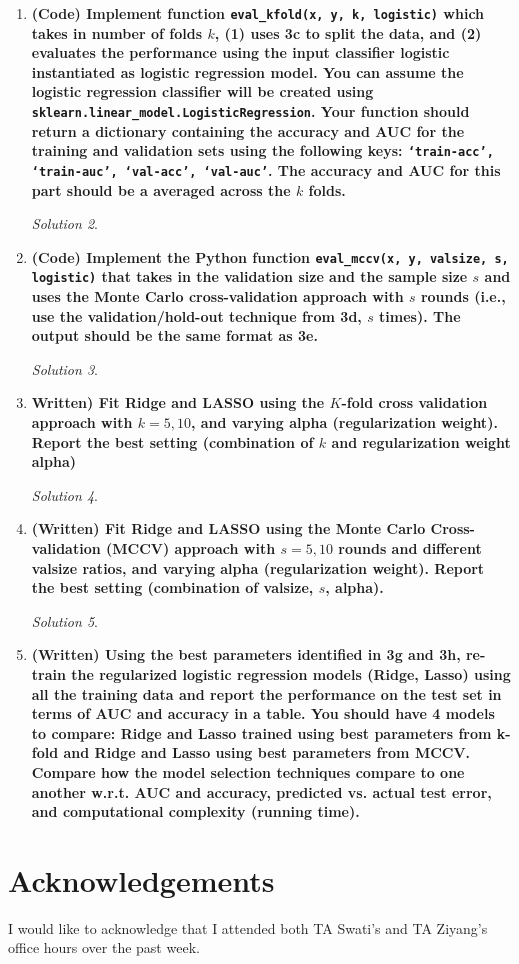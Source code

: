 \documentclass[a4paper,12pt]{article}
\theoremstyle{definition}
\theoremstyle{remark}
\newtheorem*{solution}{Solution}
\begin{document}
\begin{enumerate}
\begin{enumerate}
\begin{solution}
			\end{solution}
			\item {\bf (Code) Implement function \texttt{eval\_kfold(x, y, k, logistic)} which takes in number of folds $k$, (1) uses 3c to split the data, and (2) evaluates the performance using the input classifier logistic instantiated as logistic regression model. You can assume the logistic regression classifier will be created using \texttt{sklearn.linear\_model.LogisticRegression}. Your function should return a dictionary containing the accuracy and AUC for the training and validation sets using the following keys: \texttt{‘train-acc’, ‘train-auc’, ‘val-acc’, ‘val-auc’}. The accuracy and AUC for this part should be a averaged across the $k$ folds.}
			\begin{solution}
				
				
			\end{solution}
			\item {\bf (Code) Implement the Python function \texttt{eval\_mccv(x, y, valsize, s, logistic)} that takes in the validation size and the sample size $s$ and uses the Monte Carlo cross-validation approach with $s$ rounds (i.e., use the validation/hold-out technique from 3d, $s$ times). The output should be the same format as 3e.}
			\begin{solution}
				
			\end{solution}
			\item {\bf Written) Fit Ridge and LASSO using the $K$-fold cross validation approach with $k = 5, 10$, and varying alpha (regularization weight). Report the best setting (combination of $k$ and regularization weight alpha)}
			\begin{solution}
			
			\end{solution}
			\item {\bf (Written) Fit Ridge and LASSO using the Monte Carlo Cross-validation (MCCV) approach with $s = 5, 10$ rounds and different valsize ratios, and varying alpha (regularization weight). Report the best setting (combination of valsize, $s$, alpha).}
			\begin{solution}
				
			\end{solution}
			\item {\bf (Written) Using the best parameters identified in 3g and 3h, re-train the regularized logistic regression models (Ridge, Lasso) using all the training data and report the performance on the test set in terms of AUC and accuracy in a table. You should have 4 models to compare: Ridge and Lasso trained using best parameters from k-fold and Ridge and Lasso using best parameters from MCCV. Compare how the model selection techniques compare to one another w.r.t. AUC and accuracy, predicted vs. actual test error, and computational complexity (running time).}
		\end{enumerate}
		
	\end{enumerate}
	
	
	
	
	\section*{Acknowledgements}
	I would like to acknowledge that I attended both TA Swati's and TA Ziyang's office hours over the past week.
	
\end{document}
